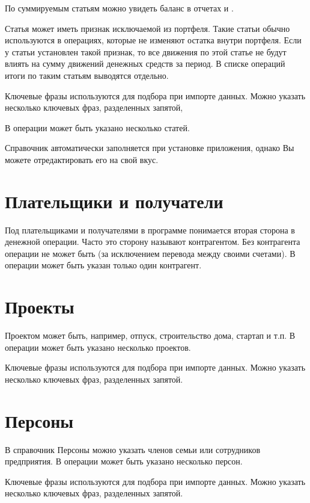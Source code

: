 \documentclass[a4paper,10pt,russian]{sphinxmanual}
\begin{document}
\sphinxAtStartPar
По суммируемым статьям можно увидеть баланс в отчетах  и .

\sphinxAtStartPar
Статья может иметь признак исключаемой из портфеля. Такие статьи обычно используются в операциях,
которые не изменяют остатка внутри портфеля. Если у статьи установлен такой признак,
то все движения по этой статье не будут влиять на сумму движений денежных средств за период.
В списке операций итоги по таким статьям выводятся отдельно.

\sphinxAtStartPar
Ключевые фразы используются для подбора при импорте данных. Можно указать несколько ключевых фраз, разделенных запятой,

\sphinxAtStartPar
В операции может быть указано несколько статей.

\sphinxAtStartPar
Справочник автоматически заполняется при установке приложения, однако Вы можете отредактировать его на свой вкус.


\section{Плательщики и получатели}
\label{\detokenize{directories:id7}}
\sphinxAtStartPar
Под плательщиками и получателями в программе понимается вторая сторона в денежной операции. Часто это сторону называют
контрагентом. Без контрагента операции не может быть (за исключением перевода между своими счетами). В операции может быть
указан только один контрагент.


\section{Проекты}
\label{\detokenize{directories:id8}}
\sphinxAtStartPar
Проектом может быть, например, отпуск, строительство дома, стартап и т.п. В операции может быть указано несколько проектов.

\sphinxAtStartPar
Ключевые фразы используются для подбора при импорте данных. Можно указать несколько ключевых фраз, разделенных запятой.


\section{Персоны}
\label{\detokenize{directories:id9}}
\sphinxAtStartPar
В справочник Персоны можно указать членов семьи или сотрудников предприятия. В операции может быть указано несколько персон.

\sphinxAtStartPar
Ключевые фразы используются для подбора при импорте данных. Можно указать несколько ключевых фраз, разделенных запятой.
\end{document}
